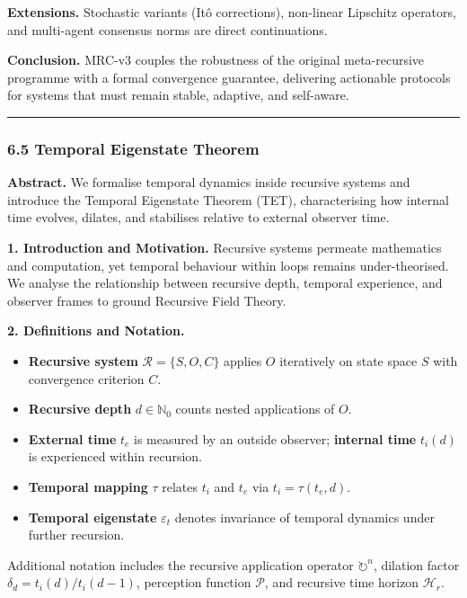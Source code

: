\documentclass[12pt]{article}
\begin{document}
\textbf{Extensions.}
Stochastic variants (Itô corrections), non-linear Lipschitz operators, and multi-agent consensus norms are direct continuations.

\textbf{Conclusion.}
MRC-v3 couples the robustness of the original meta-recursive programme with a formal convergence guarantee, delivering actionable protocols for systems that must remain stable, adaptive, and self-aware.

\begin{center}\rule{0.5\linewidth}{0.5pt}\end{center}

\subsubsection{\texorpdfstring{\textbf{6.5 Temporal Eigenstate Theorem}}{6.5 Temporal Eigenstate Theorem}}\label{temporal-eigenstate-theorem}

\textbf{Abstract.} We formalise temporal dynamics inside recursive systems and introduce the Temporal Eigenstate Theorem (TET), characterising how internal time evolves, dilates, and stabilises relative to external observer time.

\textbf{1. Introduction and Motivation.} Recursive systems permeate mathematics and computation, yet temporal behaviour within loops remains under-theorised. We analyse the relationship between recursive depth, temporal experience, and observer frames to ground Recursive Field Theory.

\textbf{2. Definitions and Notation.}
\begin{itemize}
\item \textbf{Recursive system} $\mathcal{R} = \{S,O,C\}$ applies $O$ iteratively on state space $S$ with convergence criterion $C$.
\item \textbf{Recursive depth} $d \in \mathbb{N}_0$ counts nested applications of $O$.
\item \textbf{External time} $t_e$ is measured by an outside observer; \textbf{internal time} $t_i(d)$ is experienced within recursion.
\item \textbf{Temporal mapping} $\tau$ relates $t_i$ and $t_e$ via $t_i = \tau(t_e,d)$.
\item \textbf{Temporal eigenstate} $\varepsilon_t$ denotes invariance of temporal dynamics under further recursion.
\end{itemize}
Additional notation includes the recursive application operator $\circlearrowright^n$, dilation factor $\delta_d = t_i(d)/t_i(d-1)$, perception function $\mathcal{P}$, and recursive time horizon $\mathcal{H}_r$.
\end{document}

